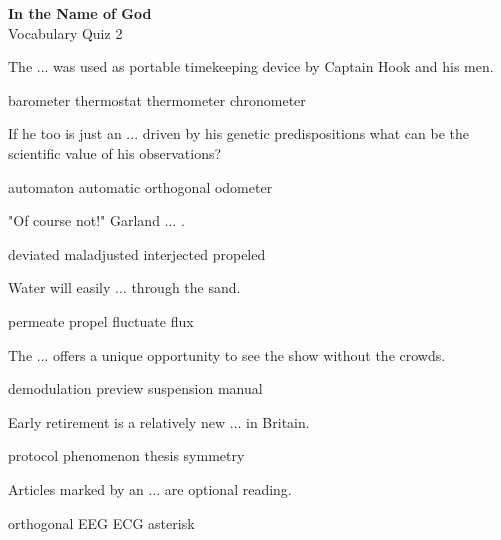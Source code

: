 \documentclass{exam}
\begin{document}
\begin{center}
\textbf{In the Name of God}\\ 
Vocabulary Quiz 2
\end{center}
\vspace{5mm}
\begin{questions}
\question The ... was used as portable timekeeping device by Captain Hook and his men.\\
\begin{oneparchoices}
 \choice barometer
 \choice thermostat
 \choice thermometer
 \correctchoice chronometer
\end{oneparchoices}
\question If he too is just an ... driven by his genetic predispositions what can be the scientific value of his observations?\\
\begin{oneparchoices}
 \correctchoice automaton
 \choice automatic
 \choice orthogonal
 \choice odometer
\end{oneparchoices}
\question "Of course not!" Garland ... .\\
\begin{oneparchoices}
 \choice deviated
 \choice maladjusted
 \correctchoice interjected
 \choice propeled
\end{oneparchoices}
\question Water will easily ... through the sand.\\
\begin{oneparchoices}
 \correctchoice permeate
 \choice propel
 \choice fluctuate
 \choice flux
\end{oneparchoices}
\question The ... offers a unique opportunity to see the show without the crowds.\\
\begin{oneparchoices}
\choice demodulation
 \correctchoice preview
 \choice suspension
 \choice manual
\end{oneparchoices}
\question Early retirement is a relatively new ... in Britain.\\
\begin{oneparchoices}
\choice protocol
 \correctchoice phenomenon
 \choice thesis
 \choice symmetry 
\end{oneparchoices}
\question Articles marked by an ... are optional reading.\\
\begin{oneparchoices}
\choice orthogonal 
 \choice EEG
 \choice ECG 
 \correctchoice asterisk
\end{oneparchoices}

\end{questions}
\end{document}

